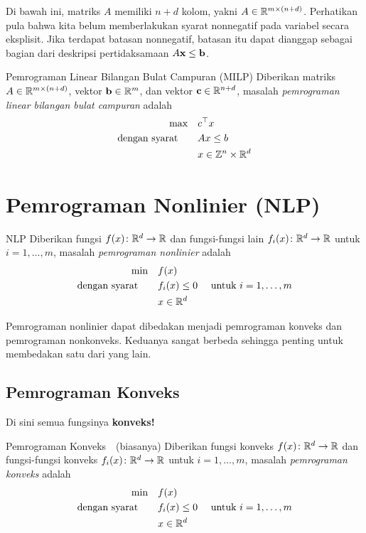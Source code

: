 Di bawah ini, matriks $A$ memiliki $n+d$ kolom, yakni $A \in {\mathbb{R}}^{m \times (n+d)}$. Perhatikan pula bahwa kita belum memberlakukan syarat nonnegatif pada variabel secara eksplisit. Jika terdapat batasan nonnegatif, batasan itu dapat dianggap sebagai bagian dari deskripsi pertidaksamaan $A\mathbf{x} \leq \mathbf{b}$.
\Needspace{0.33\textheight}
\begin{general}{Pemrograman Linear Bilangan Bulat Campuran (MILP)}{\npcomplete}
Diberikan matriks $A \in {\mathbb{R}}^{m\times (n+d)}$, vektor $\mathbf{b} \in {\mathbb{R}}^m$, dan vektor $\mathbf{c} \in {\mathbb{R}}^{n+d}$, masalah \emph{pemrograman linear bilangan bulat campuran} adalah
\begin{equation}
\label{eq:MILP}
\begin{split}
\max \quad & c^\top x\\
\mbox{dengan syarat}\quad  \quad & Ax \leq b\\
& x \in {\mathbb{Z}}^n \times {\mathbb{R}}^d
\end{split}
\end{equation}
\end{general}

\Needspace{0.45\textheight}
\section{Pemrograman Nonlinier (NLP)}
\label{sec:intro-NLP}
\begin{general}{NLP}{\nphard}
Diberikan fungsi $f(x)\colon {\mathbb{R}}^d \to {\mathbb{R}}$ dan fungsi-fungsi lain $f_i(x)\colon {\mathbb{R}}^d \to {\mathbb{R}}$ untuk $i=1, \dots, m$, masalah \emph{pemrograman nonlinier} adalah
\begin{equation}
\label{eq:NLP}
\begin{split}
\min \quad & f(x)\\
\mbox{dengan syarat}\quad  \quad & f_i(x) \leq 0  \quad  \mbox{ untuk } i=1, \dots, m\\
& x \in {\mathbb{R}}^d
\end{split}
\end{equation}
\end{general}

Pemrograman nonlinier dapat dibedakan menjadi pemrograman konveks dan pemrograman nonkonveks. Keduanya sangat berbeda sehingga penting untuk membedakan satu dari yang lain.
\subsection{Pemrograman Konveks}
Di sini semua fungsinya \textbf{konveks!}
\begin{general}{Pemrograman Konveks}{\polynomial\ \  (biasanya)}
Diberikan fungsi konveks $f(x)\colon {\mathbb{R}}^d \to {\mathbb{R}}$ dan fungsi-fungsi konveks $f_i(x)\colon {\mathbb{R}}^d \to {\mathbb{R}}$ untuk $i=1, \dots, m$, masalah \emph{pemrograman konveks} adalah
\begin{equation}
\label{eq:convex-programming}
\begin{split}
\min \quad & f(x)\\
\mbox{dengan syarat}\quad  \quad & f_i(x) \leq 0  \quad  \mbox{ untuk } i=1, \dots, m\\
& x \in {\mathbb{R}}^d
\end{split}
\end{equation}
\end{general}

